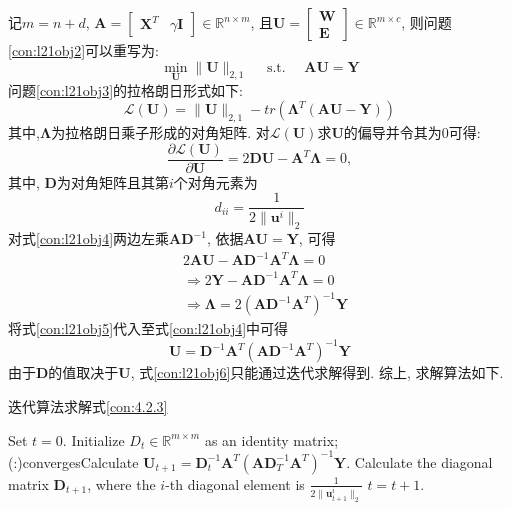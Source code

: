 \documentclass[lang=cn,10pt]{gorgeousnbook}
\numberwithin{equation}{section}%
\numberwithin{figure}{section}%
\begin{document}
记$m=n+d$, $\mathbf{A}=\left[\begin{array}{ll}\mathbf{X}^{T} & \gamma \mathbf{I} \end{array}\right] \in \mathbb{R}^{n \times m}$, 且$\mathbf{U}=\left[\begin{array}{l}
\mathbf{W} \\
\mathbf{E}
\end{array}\right] \in \mathbb{R}^{m \times c}$, 则问题\eqref{con:l21obj2}可以重写为:
\begin{equation}
\min _{\mathbf{U}}\|\mathbf{U}\|_{2,1} \quad \text { s.t. } \quad \mathbf{A U}=\mathbf{Y}\label{con:l21obj3}
\end{equation}
问题\eqref{con:l21obj3}的拉格朗日形式如下:
\begin{equation}
\mathcal{L}(\mathbf{U})=\|\mathbf{U}\|_{2,1}-tr\left(\mathbf{\Lambda}^{T}(\mathbf{A} \mathbf{U}-\mathbf{Y})\right)
\end{equation}
其中,$\mathbf{\Lambda}$为拉格朗日乘子形成的对角矩阵. 对$\mathcal{L}(\mathbf{U})$求$\mathbf{U}$的偏导并令其为0可得:
\begin{equation}
\frac{\partial \mathcal{L}\left( \mathbf{U} \right)}{\partial \mathbf{U}}=2\mathbf{DU}-\mathbf{A}^T\mathbf{\Lambda}=0, \label{con:l21obj4}
\end{equation}
其中, $\mathbf{D}$为对角矩阵且其第$i$个对角元素为
\begin{equation}
d_{ii}=\frac{1}{2\lVert \mathbf{u}^i \rVert _2}
\end{equation}
对式\eqref{con:l21obj4}两边左乘$\mathbf{AD}^{-1}$, 依据$\mathbf{AU}=\mathbf{Y}$, 可得
\begin{equation}
\begin{aligned}
&2\mathbf{AU}-\mathbf{AD}^{-1}\mathbf{A}^T\mathbf{\Lambda }=0 \\
&\Rightarrow 2\mathbf{Y}-\mathbf{AD}^{-1}\mathbf{A}^T\mathbf{\Lambda }=0\\
&\Rightarrow \mathbf{\Lambda }=2\left( \mathbf{AD}^{-1}\mathbf{A}^T \right) ^{-1}\mathbf{Y} \label{con:l21obj5}
\end{aligned}
\end{equation}
将式\eqref{con:l21obj5}代入至式\eqref{con:l21obj4}中可得
\begin{equation}
\mathbf{U}=\mathbf{D}^{-1}\mathbf{A}^T\left( \mathbf{AD}^{-1}\mathbf{A}^T \right) ^{-1}\mathbf{Y}\label{con:l21obj6}
\end{equation}
由于$\mathbf{D}$的值取决于$\mathbf{U}$, 式\eqref{con:l21obj6}只能通过迭代求解得到. 综上, 求解算法如下.
\begin{algorithm}
\caption{迭代算法求解式\eqref{con:4.2.3}}\label{algorithm 1}
 Set $t=0$. Initialize $D_{t}\in \mathbb{R}^{m\times m}$ as an identity matrix;\\
\Repeat(:){converges}{Calculate $\mathbf{U}_{t+1}=\mathbf{D}_{t}^{-1}\mathbf{A}^T\left( \mathbf{AD}_{T}^{-1}\mathbf{A}^T \right) ^{-1}\mathbf{Y.}$\;
 Calculate the diagonal matrix $\mathbf{D}_{t+1}$, where the $i$-th diagonal element is $\frac{1}{2\lVert \mathbf{u}_{t+1}^{i} \rVert _2}$\;
 $t=t+1$.}
\end{algorithm}
\end{document}
